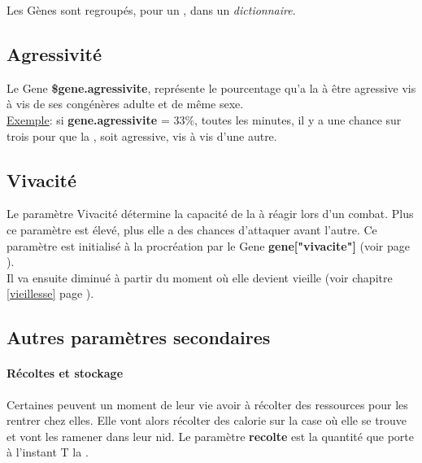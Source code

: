 \documentclass[french]{report}
\begin{document}
Les Gènes sont regroupés, pour un \CoCiX, dans un \emph{dictionnaire}.\\


\newpage

\subsection{Agressivité}\label{agressivite}
Le Gene \textbf{\$gene.agressivite}, représente le pourcentage qu'a la \CoCiX à être agressive vis à vis de ses congénères adulte et de même sexe.\\
\underline{Exemple}: si \textbf{gene.agressivite} = 33\%, toutes les minutes, il y a une chance sur trois pour que la \CoCiX, soit agressive, vis à vis d'une autre.

\subsection{Vivacité}\label{vivacite}
Le paramètre Vivacité détermine la capacité de la \CoCiX à réagir lors d'un combat. Plus ce paramètre est élevé, plus elle a des chances d'attaquer avant l'autre.
Ce paramètre est initialisé à la procréation par le Gene \textbf{gene["vivacite"]} (voir page \pageref{liste_gene}).\\
Il va ensuite diminué à partir du moment où elle devient vieille (voir chapitre \ref{vieillesse} page \pageref{vieillesse}).\\




\subsection{Autres paramètres secondaires}\label{param_second}

\paragraph{\textbf{Récoltes et stockage}}
Certaines \CoCiX peuvent un moment de leur vie avoir à récolter des ressources pour les rentrer chez elles.
Elle vont alors récolter des calorie sur la case où elle se trouve et vont les ramener dans leur nid. Le paramètre \textbf{recolte} est la quantité que porte à l'instant T la \CoCiX.
\end{document}
